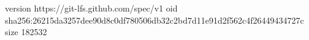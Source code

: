 version https://git-lfs.github.com/spec/v1
oid sha256:26215da3257dee90d8c0df780506db32c2bd7d11e91d2f562c4f26449434727c
size 182532
